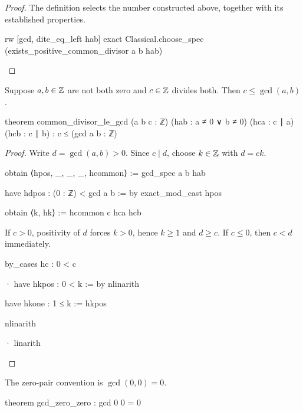 \begin{proof}
  The definition selects the number constructed above, together with its established properties.

  \begin{lean}
    rw [gcd, dite_eq_left hab]
    exact Classical.choose_spec (exists_positive_common_divisor a b hab)
  \end{lean}
\end{proof}

\begin{theorem}
  \label{ent:thm:common-divisor-le-gcd}
  Suppose $a,b\in\mathbb{Z}$ are not both zero and $c\in\mathbb{Z}$ divides both.
  Then $c\le\gcd(a,b)$.

  \begin{lean}
    theorem common_divisor_le_gcd (a b c : ℤ) (hab : a ≠ 0 ∨ b ≠ 0)
        (hca : c ∣ a) (hcb : c ∣ b) : c ≤ (gcd a b : ℤ)
  \end{lean}
\end{theorem}

\begin{proof}
  Write $d=\gcd(a,b)>0$.
  Since $c\mid d$, choose $k\in\mathbb{Z}$ with $d=ck$.

  \begin{lean}
    obtain ⟨hpos, _, _, _, hcommon⟩ := gcd_spec a b hab

    have hdpos : (0 : ℤ) < gcd a b := by
      exact_mod_cast hpos

    obtain ⟨k, hk⟩ := hcommon c hca hcb
  \end{lean}

  If $c>0$, positivity of $d$ forces $k>0$, hence $k\ge1$ and $d\ge c$.
  If $c\le0$, then $c<d$ immediately.

  \begin{lean}
    by_cases hc : 0 < c

    · have hkpos : 0 < k := by
        nlinarith

      have hkone : 1 ≤ k := hkpos

      nlinarith

    · linarith
  \end{lean}
\end{proof}

\begin{theorem}
  \label{ent:thm:gcd-zero-zero}
  The zero-pair convention is $\gcd(0,0)=0$.

  \begin{lean}
    theorem gcd_zero_zero : gcd 0 0 = 0
  \end{lean}
\end{theorem}


